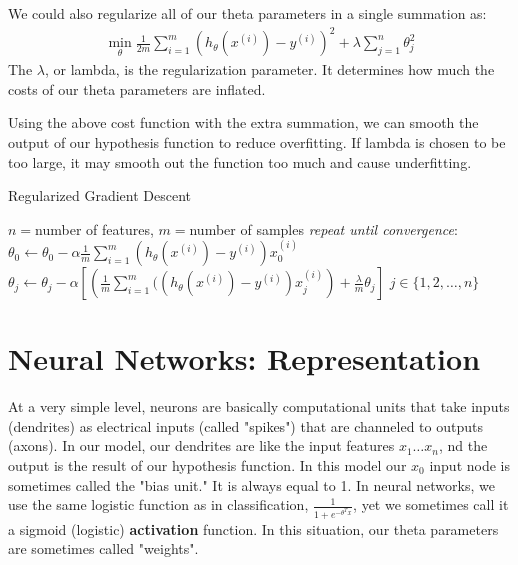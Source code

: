 \documentclass{article}
\begin{document}
            We could also regularize all of our theta parameters in a single summation as:
            \begin{align*}
                \min_{\theta}\frac{1}{2m}\sum_{i=1}^m(h_{\theta}(x^{(i)})-y^{(i)})^2 + \lambda\sum_{j=1}^{n}\theta_j^2        
            \end{align*}
            The $\lambda$, or lambda, is the regularization parameter. It determines how much the costs of our theta parameters are inflated.

            Using the above cost function with the extra summation, we can smooth the output of our hypothesis function to reduce overfitting. If lambda is chosen 
            to be too large, it may smooth out the function too much and cause underfitting.

            \begin{algorithm}
                \caption{Regularized Gradient Descent}
                \begin{algorithmic}
                    \STATE $n = $number of features, $m = $number of samples
                    \STATE \emph{repeat until convergence}:
                    \STATE \hspace{12pt}$\theta_0 \gets \theta_0 - \alpha\frac{1}{m}\sum_{i=1}^{m}(h_{\theta}(x^{(i)})-y^{(i)})x_0^{(i)}$
                    \STATE \hspace{12pt}$\theta_j \gets \theta_j - \alpha\left[\left(\frac{1}{m}\sum_{i=1}^{m}((h_{\theta}(x^{(i)})-y^{(i)})x_j^{(i)}\right) + \frac{\lambda}{m}\theta_j\right]$ \qquad $j \in \{1,2,\ldots,n\}$
                \end{algorithmic}
            \end{algorithm}    

    \section{Neural Networks: Representation}

        At a very simple level, neurons are basically computational units that take inputs 
        (dendrites) as electrical inputs (called "spikes") that are channeled to outputs (axons). In our model, 
        our dendrites are like the input features $x_1 \ldots x_n$, nd the output is the result of our hypothesis function. In this model our $x_0$
        input node is sometimes called the "bias unit." It is always equal to 1. In neural networks, 
        we use the same logistic function as in classification, $\frac{1}{1+e^{-\theta^Tx}}$, yet we sometimes call it a sigmoid (logistic)
        \textbf{activation} function. In this situation, our theta parameters are sometimes called "weights".
\end{document}
